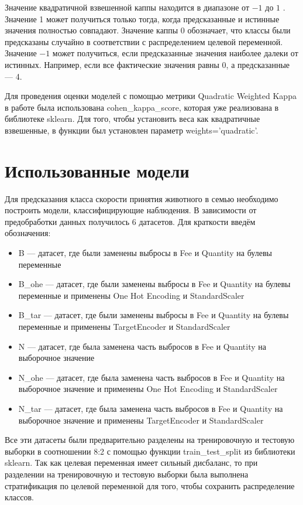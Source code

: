 \documentclass[14pt]{mmcs_article}
\begin{document}
Значение квадратичной взвешенной каппы находится в диапазоне от $-1$ до $1$ \cite{lib:kappa2}. Значение 1 может получиться только тогда, когда предсказанные и истинные значения полностью совпадают. Значение каппы 0 обозначает, что классы были предсказаны случайно в соответствии с распределением целевой переменной. Значение $-1$ может получиться, если предсказанные значения наиболее далеки от истинных. Например, если все фактические значения равны 0, а предсказанные --- 4.

Для проведения оценки моделей с помощью метрики Quadratic Weighted Kappa в работе была использована cohen\_kappa\_score, которая уже реализована в библиотеке sklearn. Для того, чтобы установить веса как квадратичные взвешенные, в функции был установлен параметр weights='quadratic'.


\newpage
\section{Использованные модели}

Для предсказания класса скорости принятия животного в семью необходимо построить модели, классифицирующие наблюдения. В зависимости от предобработки данных получилось 6 датасетов. Для краткости введём обозначения: 

\begin{itemize}
	\item B --- датасет, где были заменены выбросы в Fee и Quantity на булевы переменные
	\item B\_ohe --- датасет, где были заменены выбросы в Fee и Quantity на булевы переменные и применены One Hot Encoding и StandardScaler
	\item B\_tar --- датасет, где были заменены выбросы в Fee и Quantity на булевы переменные и применены TargetEncoder и StandardScaler
	\item N — датасет, где была заменена часть выбросов в Fee и Quantity на выборочное значение 
	\item N\_ohe --- датасет, где была заменена часть выбросов в Fee и Quantity на выборочное значение и применены One Hot Encoding и StandardScaler
	\item N\_tar --- датасет, где была заменена часть выбросов в Fee и Quantity на выборочное значение и применены TargetEncoder и StandardScaler
\end{itemize}

Все эти датасеты были предварительно разделены на тренировочную и тестовую выборки в соотношении 8:2 с помощью функции train\_test\_split из библиотеки sklearn. Так как целевая переменная имеет сильный дисбаланс, то при разделении на тренировочную и тестовую выборки была выполнена стратификация по целевой переменной для того, чтобы сохранить распределение классов.
\end{document}
